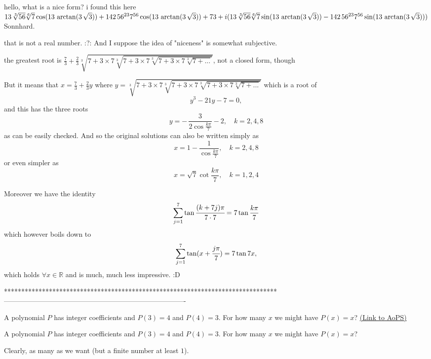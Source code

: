 \begin{solution}
	\begin{tcolorbox}hello, what is a nice form? i found this here
$1\/3\,\sqrt [3]{56}\sqrt [6]{7}\cos ( 1\/3\,\arctan ( 3\,
\sqrt {3} )  ) +1\/42\,{56}^{2\/3}{7}^{5\/6}\cos ( 1\/3\,
\arctan ( 3\,\sqrt {3} )  ) +7\/3+i ( 1\/3\,\sqrt 
[3]{56}\sqrt [6]{7}\sin ( 1\/3\,\arctan ( 3\,\sqrt {3}
 )  ) -1\/42\,{56}^{2\/3}{7}^{5\/6}\sin ( 1\/3\,\arctan
 ( 3\,\sqrt {3} )  )  ) 
$
Sonnhard.\end{tcolorbox}that is not a real number. :?: And I suppose the idea of "niceness" is somewhat subjective.

\begin{tcolorbox}the greatest root is $\boxed{\frac 73+\frac 23\sqrt[3]{7+3\times 7\sqrt[3]{7+3\times 7\sqrt[3]{7+3\times 7\sqrt[3]{7+...}}}}}$, not a closed form, though\end{tcolorbox}But it means that $x=\frac 73+\frac 23y$ where ${y=\sqrt[3]{7+3\times 7\sqrt[3]{7+3\times 7\sqrt[3]{7+3\times 7\sqrt[3]{7+...}}}}}$ which is a root of \[y^3-21y-7=0,\] and this has the three roots\[y=-\,\frac3{2\cos\frac{k\pi}7}-2,\quad k=2,4,8\] as can be easily checked. And so the original solutions can also be written simply as \[\boxed{x=1-\frac1{\cos\frac{k\pi}7},\quad k=2,4,8}\] or even simpler as  \[\boxed{x=\sqrt{7}\cot\frac{k\pi}7,\quad k=1,2,4}\] 

Moreover we have the identity \[{{\sum\limits_{j=1}^{7}\tan\cfrac{{(k+7j)\pi}}{{7\cdot7}}} =  7\tan\frac{k\pi}7} \] which however boils down to \[{{\sum\limits_{j=1}^{7}\tan(x+\cfrac{{j\pi}}{{7}}} ) =  7\tan7x}, \] which holds $\forall x\in\mathbb R$ and is much, much less impressive. :D
\end{solution}
*******************************************************************************
-------------------------------------------------------------------------------

\begin{problem}
	A polynomial $P$ has integer coefficients and $P(3)=4$ and $P(4)=3$. For how many $x$ we might have $P(x)=x$?
	\flushright \href{https://artofproblemsolving.com/community/c6h446106}{(Link to AoPS)}
\end{problem}



\begin{solution}
	\begin{tcolorbox}A polynomial $P$ has integer coefficients and $P(3)=4$ and $P(4)=3$. For how many $x$ we might have $P(x)=x$?\end{tcolorbox}
Clearly, as many as we want (but a finite number at least $1$).
\end{solution}



